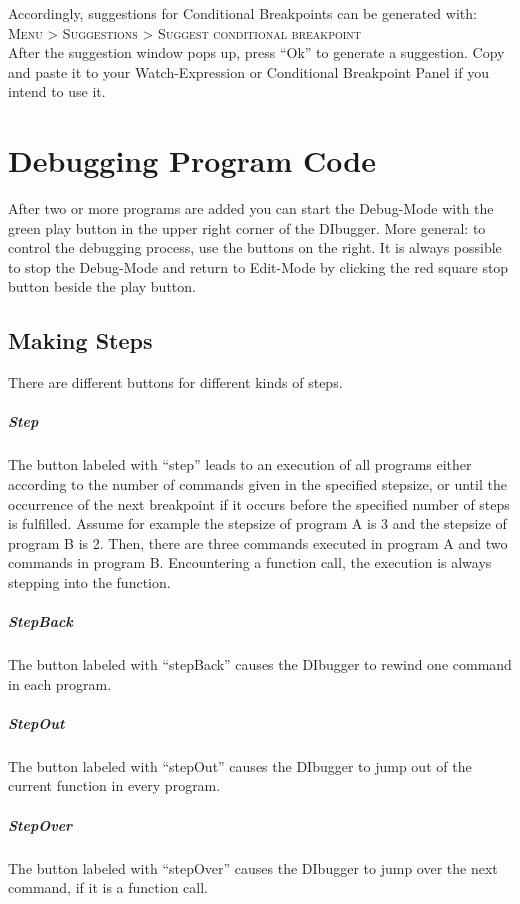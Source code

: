 \documentclass[parskip=full]{memoir}
\begin{document}
Accordingly, suggestions for Conditional Breakpoints can be generated with:\\
\textsc{Menu > Suggestions > Suggest conditional breakpoint}\\

After the suggestion window pops up, press \enquote{Ok} to generate a suggestion.
Copy and paste it to your Watch-Expression or Conditional Breakpoint Panel if you intend to use it.

\chapter{Debugging Program Code} %
After two or more programs are added you can start the Debug-Mode with the green play button in the upper right corner of the DIbugger. More general: to control the debugging process, use the buttons on the right. It is always possible to stop the Debug-Mode and return to Edit-Mode by clicking the red square stop button beside the play button.
\section{Making Steps}
There are different buttons for different kinds of steps.
\paragraph{Step}
The button labeled with \enquote{step} leads to an execution of all programs either according to the number of commands given in the specified stepsize, or until the occurrence of the next breakpoint if it occurs before the specified number of steps is fulfilled. Assume for example the stepsize of program A is 3 and the stepsize of program B is 2. Then, there are three commands executed in program A and two commands in program B. Encountering a function call, the execution is always stepping into the function.
\paragraph{StepBack}
The button labeled with \enquote{stepBack} causes the DIbugger to rewind one command in each program.
\paragraph{StepOut}
The button labeled with \enquote{stepOut} causes the DIbugger to jump out of the current function in every program.
\paragraph{StepOver}
The button labeled with \enquote{stepOver} causes the DIbugger to jump over the next command, if it is a function call.
\end{document}
